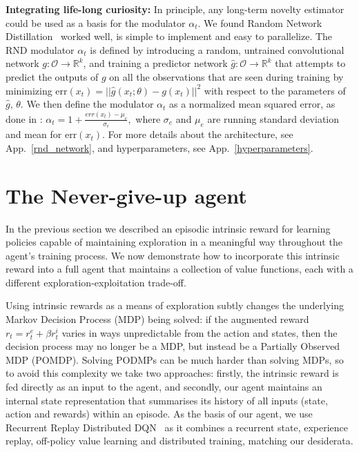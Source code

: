 \documentclass{article} %
\begin{document}
{\bf Integrating life-long curiosity:} In principle, any long-term novelty estimator could be used as a basis for the modulator $\alpha_t$. 
We found Random Network Distillation~\citep[RND]{burda2018exploration} worked well, is simple to implement and easy to parallelize. The RND modulator $\alpha_t$ is defined by introducing a random, untrained convolutional network $g: \mathcal{O} \rightarrow \mathbb{R}^k$, and training a predictor network $\hat{g}: \mathcal{O} \rightarrow \mathbb{R}^k$ that attempts to predict the outputs of $g$ on all the observations that are seen during training by minimizing $\text{err}(x_t) = ||\hat{g}(x_t;\theta)-g(x_t)||^2$ with respect to the parameters of $\hat{g}$, $\theta$.
%
We then define the modulator $\alpha_t$ as a normalized mean squared error, as done in \citet{burda2018exploration}:
$\alpha_t=1 + \frac{err(x_t)-\mu_e}{\sigma_e},$
where $\sigma_e$ and $\mu_e$ are running standard deviation and mean for $\text{err}(x_t)$.
For more details about the architecture, see App.~\ref{rnd_network}, and hyperparameters, see App.~\ref{hyperparameters}.

\section{The Never-give-up agent}
\label{agent_description}
In the previous section we described an episodic intrinsic reward for learning policies capable of maintaining exploration in a meaningful way throughout the agent's training process.
We now demonstrate how to incorporate this intrinsic reward into a full agent that maintains a collection of value functions, each with a different exploration-exploitation trade-off.

Using intrinsic rewards as a means of exploration subtly changes the underlying Markov Decision Process (MDP) being solved: if the augmented reward $r_t=r^e_t+\beta r^i_t$ varies in ways unpredictable from the action and states, then the decision process may no longer be a MDP, but instead be a Partially Observed MDP (POMDP).
Solving PODMPs can be much harder than solving MDPs, so to avoid this complexity we take two approaches: firstly, the intrinsic reward is fed directly as an input to the agent, and secondly, our agent maintains an internal state representation that summarises its history of all inputs (state, action and rewards) within an episode.
As the basis of our agent, we use Recurrent Replay Distributed DQN~\citep[R2D2]{r2d2} as it combines a recurrent state, experience replay, off-policy value learning and distributed training, matching our desiderata.
\end{document}
